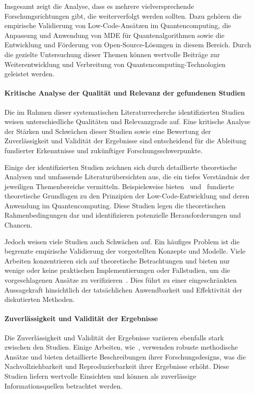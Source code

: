 Insgesamt zeigt die Analyse, dass es mehrere vielversprechende Forschungsrichtungen gibt, die weiterverfolgt werden sollten. 
Dazu gehören die empirische Validierung von Low-Code-Ansätzen im Quantencomputing, die Anpassung und Anwendung von MDE für 
Quantenalgorithmen sowie die Entwicklung und Förderung von Open-Source-Lösungen in diesem Bereich. Durch die gezielte 
Untersuchung dieser Themen können wertvolle Beiträge zur Weiterentwicklung und Verbreitung von Quantencomputing-Technologien geleistet werden.

\paragraph{Kritische Analyse der Qualität und Relevanz der gefundenen Studien}

Die im Rahmen dieser systematischen Literaturrecherche identifizierten Studien weisen unterschiedliche 
Qualitäten und Relevanzgrade auf. Eine kritische Analyse der Stärken und Schwächen dieser Studien sowie eine Bewertung 
der Zuverlässigkeit und Validität der Ergebnisse sind entscheidend für die Ableitung fundierter Erkenntnisse und zukünftiger Forschungsschwerpunkte.

Einige der identifizierten Studien zeichnen sich durch detaillierte theoretische Analysen und umfassende 
Literaturübersichten aus, die ein tiefes Verständnis der jeweiligen Themenbereiche vermitteln. 
Beispielsweise bieten~\cite{Perez-Delgado_2020} und~\cite{Gemeinhardt_2021} fundierte theoretische Grundlagen 
zu den Prinzipien der Low-Code-Entwicklung und deren Anwendung im Quantencomputing. Diese Studien legen die 
theoretischen Rahmenbedingungen dar und identifizieren potenzielle Herausforderungen und Chancen.

Jedoch weisen viele Studien auch Schwächen auf. Ein häufiges Problem ist die begrenzte empirische Validierung 
der vorgestellten Konzepte und Modelle. Viele Arbeiten konzentrieren sich auf theoretische Betrachtungen und 
bieten nur wenige oder keine praktischen Implementierungen oder Fallstudien, um die vorgeschlagenen Ansätze 
zu verifizieren~\cite{Amato_2023}. Dies führt zu einer eingeschränkten Aussagekraft hinsichtlich der tatsächlichen 
Anwendbarkeit und Effektivität der diskutierten Methoden.

\paragraph{Zuverlässigkeit und Validität der Ergebnisse}
Die Zuverlässigkeit und Validität der Ergebnisse variieren ebenfalls stark zwischen den Studien. Einige 
Arbeiten, wie~\cite{Ahmad_2023}, verwenden robuste methodische Ansätze und bieten detaillierte Beschreibungen 
ihrer Forschungsdesigns, was die Nachvollziehbarkeit und Reproduzierbarkeit ihrer Ergebnisse erhöht. Diese Studien 
liefern wertvolle Einsichten und können als zuverlässige Informationsquellen betrachtet werden.

